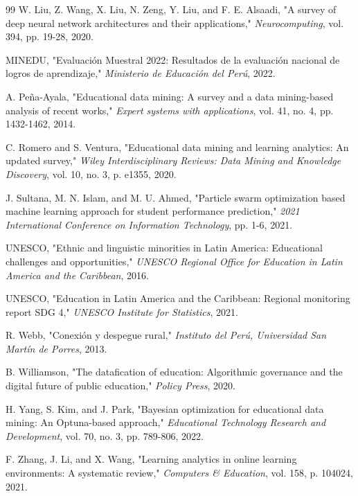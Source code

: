 \documentclass[conference]{IEEEtran}
\begin{document}
\begin{thebibliography}{99}
 W. Liu, Z. Wang, X. Liu, N. Zeng, Y. Liu, and F. E. Alsaadi, "A survey of deep neural network architectures and their applications," \textit{Neurocomputing}, vol. 394, pp. 19-28, 2020.

 MINEDU, "Evaluación Muestral 2022: Resultados de la evaluación nacional de logros de aprendizaje," \textit{Ministerio de Educación del Perú}, 2022.

 A. Peña-Ayala, "Educational data mining: A survey and a data mining-based analysis of recent works," \textit{Expert systems with applications}, vol. 41, no. 4, pp. 1432-1462, 2014.

 C. Romero and S. Ventura, "Educational data mining and learning analytics: An updated survey," \textit{Wiley Interdisciplinary Reviews: Data Mining and Knowledge Discovery}, vol. 10, no. 3, p. e1355, 2020.

 J. Sultana, M. N. Islam, and M. U. Ahmed, "Particle swarm optimization based machine learning approach for student performance prediction," \textit{2021 International Conference on Information Technology}, pp. 1-6, 2021.

 UNESCO, "Ethnic and linguistic minorities in Latin America: Educational challenges and opportunities," \textit{UNESCO Regional Office for Education in Latin America and the Caribbean}, 2016.

 UNESCO, "Education in Latin America and the Caribbean: Regional monitoring report SDG 4," \textit{UNESCO Institute for Statistics}, 2021.

 R. Webb, "Conexión y despegue rural," \textit{Instituto del Perú, Universidad San Martín de Porres}, 2013.

 B. Williamson, "The datafication of education: Algorithmic governance and the digital future of public education," \textit{Policy Press}, 2020.

 H. Yang, S. Kim, and J. Park, "Bayesian optimization for educational data mining: An Optuna-based approach," \textit{Educational Technology Research and Development}, vol. 70, no. 3, pp. 789-806, 2022.

 F. Zhang, J. Li, and X. Wang, "Learning analytics in online learning environments: A systematic review," \textit{Computers \& Education}, vol. 158, p. 104024, 2021.
\end{thebibliography}
\end{document}
